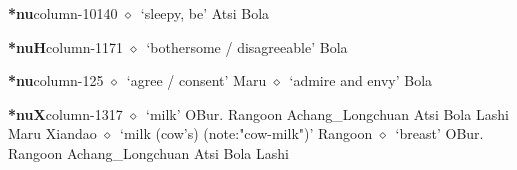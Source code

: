   \item {\footnotesize \textbf{*nu}}{\tiny column-10140}
         $\diamond$~`sleepy, be'
         Atsi 
\hspace{1ex}
         Bola 
  \item {\footnotesize \textbf{*nuH}}{\tiny column-1171}
         $\diamond$~`bothersome / disagreeable'
         Bola 
  \item {\footnotesize \textbf{*nu}}{\tiny column-125}
         $\diamond$~`agree / consent'
         Maru 
\hspace{1ex}
         $\diamond$~`admire and envy'
         Bola 
  \item {\footnotesize \textbf{*nuX}}{\tiny column-1317}
         $\diamond$~`milk'
         OBur. 
\hspace{1ex}
         Rangoon 
\hspace{1ex}
         Achang\_Longchuan 
\hspace{1ex}
         Atsi 
\hspace{1ex}
         Bola 
\hspace{1ex}
         Lashi 
\hspace{1ex}
         Maru 
\hspace{1ex}
         Xiandao 
\hspace{1ex}
         $\diamond$~`milk (cow's) (note:"cow-milk")'
         Rangoon 
\hspace{1ex}
         $\diamond$~`breast'
         OBur. 
\hspace{1ex}
         Rangoon 
\hspace{1ex}
         Achang\_Longchuan 
\hspace{1ex}
         Atsi 
\hspace{1ex}
         Bola 
\hspace{1ex}
         Lashi 
